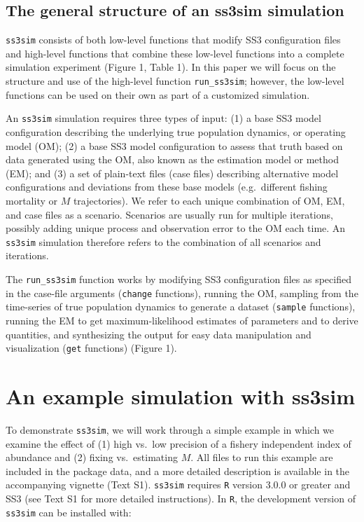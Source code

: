 \documentclass[11pt]{article}
\begin{document}
\subsection*{The general structure of an ss3sim simulation}

\texttt{ss3sim} consists of both low-level functions that modify SS3 configuration files and high-level functions that combine these low-level functions into a complete simulation experiment (Figure 1, Table 1). In this paper we will focus on the structure and use of the high-level function \texttt{run\_ss3sim}; however, the low-level functions can be used on their own as part of a customized simulation.

An \texttt{ss3sim} simulation requires three types of input: (1) a base SS3 model configuration describing the underlying true population dynamics, or operating model (OM); (2) a base SS3 model configuration to assess that truth based on data generated using the OM, also known as the estimation model or method (EM); and (3) a set of plain-text files (case files) describing alternative model configurations and deviations from these base models (e.g.~different fishing mortality or $M$ trajectories). We refer to each unique combination of OM, EM, and case files as a scenario. Scenarios are usually run for multiple iterations, possibly adding unique process and observation error to the OM each time. An \texttt{ss3sim} simulation therefore refers to the combination of all scenarios and iterations.

The \texttt{run\_ss3sim} function works by modifying SS3 configuration files as specified in the case-file arguments (\texttt{change} functions), running the OM, sampling from the time-series of true population dynamics to generate a dataset (\texttt{sample} functions), running the EM to get maximum-likelihood estimates of parameters and to derive quantities, and synthesizing the output for easy data manipulation and visualization (\texttt{get} functions) (Figure 1).

\section*{An example simulation with ss3sim}

To demonstrate \texttt{ss3sim}, we will work through a simple example in which we examine the effect of (1) high vs.~low precision of a fishery independent index of abundance and (2) fixing vs.~estimating $M$. All files to run this example are included in the package data, and a more detailed description is available in the accompanying vignette (Text S1). \texttt{ss3sim} requires \texttt{R} version 3.0.0 or greater and SS3 (see Text S1 for more detailed instructions). In \texttt{R}, the development version of \texttt{ss3sim} can be installed with:
\end{document}
